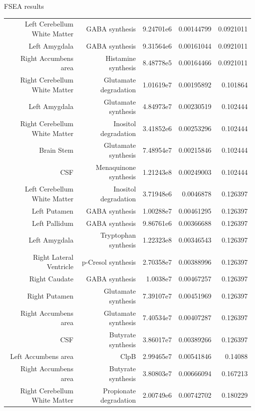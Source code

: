 \begin{frame}{FSEA results}
\begin{table}
\begin{tabular}{rrrrr}
            Left Cerebellum White Matter & GABA synthesis & 9.24701e6 & 0.00144799 & 0.0921011 \\
            Left Amygdala & GABA synthesis & 9.31564e6 & 0.00161044 & 0.0921011 \\
            Right Accumbens area & Histamine synthesis & 8.48778e5 & 0.00164466 & 0.0921011 \\
            Right Cerebellum White Matter & Glutamate degradation & 1.01619e7 & 0.00195892 & 0.101864 \\
            Left Amygdala & Glutamate synthesis & 4.84973e7 & 0.00230519 & 0.102444 \\
            Right Cerebellum White Matter & Inositol degradation & 3.41852e6 & 0.00253296 & 0.102444 \\
            Brain Stem & Glutamate synthesis & 7.48954e7 & 0.00215846 & 0.102444 \\
            CSF & Menaquinone synthesis & 1.21243e8 & 0.00249003 & 0.102444 \\
            Left Cerebellum White Matter & Inositol degradation & 3.71948e6 & 0.0046878 & 0.126397 \\
            Left Putamen & GABA synthesis & 1.00288e7 & 0.00461295 & 0.126397 \\
            Left Pallidum & GABA synthesis & 9.86761e6 & 0.00366688 & 0.126397 \\
            Left Amygdala & Tryptophan synthesis & 1.22323e8 & 0.00346543 & 0.126397 \\
            Right Lateral Ventricle & p-Cresol synthesis & 2.70358e7 & 0.00388996 & 0.126397 \\
            Right Caudate & GABA synthesis & 1.0038e7 & 0.00467257 & 0.126397 \\
            Right Putamen & Glutamate synthesis & 7.39107e7 & 0.00451969 & 0.126397 \\
            Right Accumbens area & Glutamate synthesis & 7.40534e7 & 0.00407287 & 0.126397 \\
            CSF & Butyrate synthesis & 3.86017e7 & 0.00389266 & 0.126397 \\
            Left Accumbens area & ClpB & 2.99465e7 & 0.00541846 & 0.14088 \\
            Right Accumbens area & Butyrate synthesis & 3.80803e7 & 0.00666094 & 0.167213 \\
            Right Cerebellum White Matter & Propionate degradation & 2.00749e6 & 0.00742702 & 0.180229 \\\hline\hline
        \end{tabular}
    \end{table}

\end{frame} 



